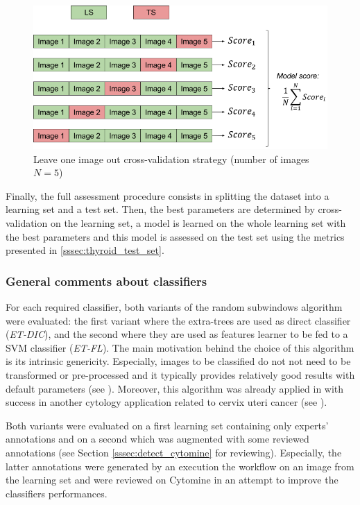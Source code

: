 \begin{figure}
	\center
	\includegraphics[scale=0.5]{image/leave_one_image_out.png}
	\caption{Leave one image out cross-validation strategy (number of images $N = 5$)}
	\label{fig:loio}
\end{figure}

Finally, the full assessment procedure consists in splitting the dataset into a learning set and a test set. Then, the best parameters are determined by cross-validation on the learning set, a model is learned on the whole learning set with the best parameters and this model is assessed on the test set using the metrics presented in \ref{sssec:thyroid_test_set}.

\subsubsection{General comments about classifiers}
\label{sssec:general_classif}
For each required classifier, both variants of the random subwindows algorithm were evaluated: the first variant where the extra-trees are used as direct classifier (\textit{ET-DIC}), and the second where they are used as features learner to be fed to a SVM classifier (\textit{ET-FL}). The main motivation behind the choice of this algorithm is its intrinsic genericity. Especially, images to be classified do not not need to be transformed or pre-processed and it typically provides relatively good results with default parameters (see \cite{Maree201617}). Moreover, this algorithm was already applied in with success in another cytology application related to cervix uteri cancer (see \cite{delga2014evaluation}).

Both variants were evaluated on a first learning set containing only experts' annotations and on a second which was augmented with some reviewed annotations (see Section \ref{sssec:detect_cytomine} for reviewing). Especially, the latter annotations were generated by an execution the workflow on an image from the learning set and  were reviewed on Cytomine in an attempt to improve the classifiers performances. 

